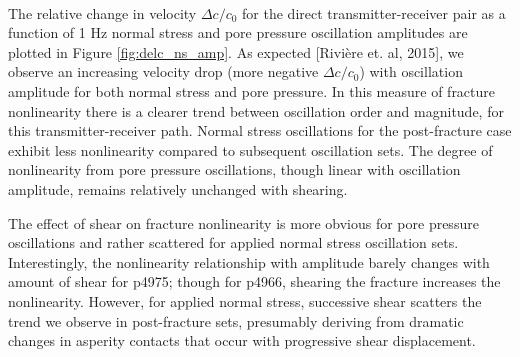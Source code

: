 \documentclass[letterpaper,10pt]{article}
\begin{document}
	\clearpage
	
	\paragraph{}
	The relative change in velocity $ \Delta c/c_0 $ for the direct transmitter-receiver pair as a function of 1 Hz normal stress and pore pressure oscillation amplitudes are plotted in Figure \ref{fig:delc_ns_amp}. As expected [Rivière et. al, 2015], we observe an increasing velocity drop (more negative $ \Delta c/c_0 $) with oscillation amplitude for both normal stress and pore pressure. 
	In this measure of fracture nonlinearity there is a clearer trend between oscillation order and magnitude, for this transmitter-receiver path. Normal stress oscillations for the post-fracture case exhibit less nonlinearity compared to  subsequent oscillation sets. The degree of nonlinearity from pore pressure oscillations, though linear with oscillation amplitude, remains relatively unchanged with shearing. 
	
	The effect of shear on fracture nonlinearity is more obvious for pore pressure oscillations and rather scattered for applied normal stress oscillation sets. Interestingly, the nonlinearity relationship with amplitude barely changes with amount of shear for p4975; though for p4966,  shearing the fracture increases the nonlinearity. However, for applied normal stress, successive shear scatters the trend we observe in post-fracture sets, presumably deriving from dramatic changes in asperity contacts that occur with progressive shear displacement.
	
	\clearpage
	
\end{document}
